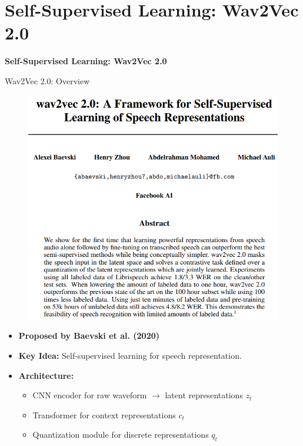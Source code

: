 \section{Self-Supervised Learning: Wav2Vec 2.0}

\begin{frame}{}
    \LARGE \textbf{Self-Supervised Learning: Wav2Vec 2.0}
\end{frame}

\begin{frame}[allowframebreaks]{Wav2Vec 2.0: Overview}
    \begin{figure}
        \centering
        \includegraphics[width=\textwidth,height=0.9\textheight,keepaspectratio]{images/audio-nlp/wav2vec-paper.png}
    \end{figure}
    \begin{itemize}
        \item \textbf{Proposed by Baevski et al. (2020)}
        \item \textbf{Key Idea:} Self-supervised learning for speech representation.
        \item \textbf{Architecture:}
        \begin{itemize}
            \item CNN encoder for raw waveform $\rightarrow$ latent representations $z_t$
            \item Transformer for context representations $c_t$
            \item Quantization module for discrete representations $q_t$

\end{itemize}
\end{itemize}
\end{frame}
